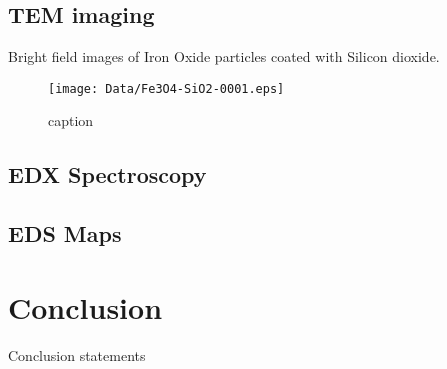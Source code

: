 \documentclass[12pt]{article} %
\begin{document}
\subsection{TEM imaging} %
\label{sub:tem_imaging}

Bright field images of Iron Oxide particles coated with Silicon dioxide.

\begin{figure}[htbp]
  \centering
  \texttt{[image: Data/Fe3O4-SiO2-0001.eps]}
  \caption{caption}
  \label{fig:label}
\end{figure}


\subsection{EDX Spectroscopy} %
\label{sub:edx_spectroscopy}


\subsection{EDS Maps} %
\label{sub:eds_maps}



\section{Conclusion} %


Conclusion statements


 
 \nocite{*}
\end{document}
